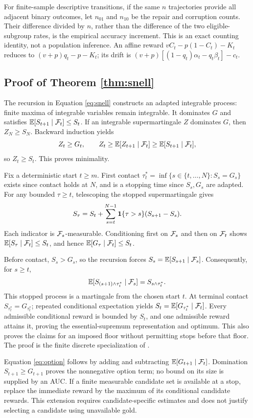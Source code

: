 For finite-sample descriptive transitions, if the same \(n\) trajectories
provide all adjacent binary outcomes, let \(n_{01}\) and \(n_{10}\) be the
repair and corruption counts. Their difference divided by \(n\), rather than
the difference of the two eligible-subgroup rates, is the empirical accuracy
increment. This is an exact counting identity, not a population inference.
An affine reward \(vC_t-p(1-C_t)-K_t\) reduces to
\((v+p)q_t-p-K_t\); its drift is
\((v+p)[(1-q_t)\alpha_t-q_t\beta_t]-c_t\).

\subsection{Proof of Theorem \ref{thm:snell}}
The recursion in Equation \eqref{eq:snell} constructs an adapted integrable
process: finite maxima of integrable variables remain integrable.
It dominates \(G\) and satisfies
\(\mathbb E[S_{t+1}\mid\mathcal F_t]\le S_t\).
If an integrable supermartingale \(Z\) dominates \(G\), then \(Z_N\ge S_N\).
Backward induction yields
\[
 Z_t\ge G_t,\qquad
 Z_t\ge\mathbb E[Z_{t+1}\mid\mathcal F_t]\ge\mathbb E[S_{t+1}\mid\mathcal F_t],
\]
so \(Z_t\ge S_t\). This proves minimality.

Fix a deterministic start \(t\ge m\). First contact
\(\tau_t^*=\inf\{s\in\{t,\ldots,N\}:S_s=G_s\}\) exists since contact holds
at \(N\), and is a stopping time since \(S_s,G_s\) are adapted.
For any bounded \(\tau\ge t\), telescoping the stopped supermartingale gives
\[
 S_\tau=S_t+\sum_{s=t}^{N-1}\mathbf 1\{\tau>s\}(S_{s+1}-S_s).
\]
Each indicator is \(\mathcal F_s\)-measurable. Conditioning first on \(\mathcal F_s\) and
then on \(\mathcal F_t\) shows
\(\mathbb E[S_\tau\mid\mathcal F_t]\le S_t\), and hence
\(\mathbb E[G_\tau\mid\mathcal F_t]\le S_t\).

Before contact, \(S_s>G_s\), so the recursion forces
\(S_s=\mathbb E[S_{s+1}\mid\mathcal F_s]\). Consequently, for \(s\ge t\),
\[
 \mathbb E[S_{(s+1)\wedge\tau_t^*}\mid\mathcal F_s]=S_{s\wedge\tau_t^*}.
\]
This stopped process is a martingale from the chosen start \(t\).
At terminal contact \(S_{\tau_t^*}=G_{\tau_t^*}\); repeated conditional
expectation yields \(S_t=\mathbb E[G_{\tau_t^*}\mid\mathcal F_t]\).
Every admissible conditional reward is bounded by \(S_t\), and one admissible
reward attains it, proving the essential-supremum representation and optimum.
This also proves the claims for an imposed floor without permitting stops
before that floor. The proof is the finite discrete specialization of
\citet{ferguson,peskir2006}.

Equation \eqref{eq:option} follows by adding and subtracting
\(\mathbb E[G_{t+1}\mid\mathcal F_t]\). Domination \(S_{t+1}\ge G_{t+1}\) proves the
nonnegative option term; no bound on its size is supplied by an AUC.
If a finite measurable candidate set is available at a stop, replace the
immediate reward by the maximum of its conditional candidate rewards.
This extension requires candidate-specific estimates and does not justify
selecting a candidate using unavailable gold.

